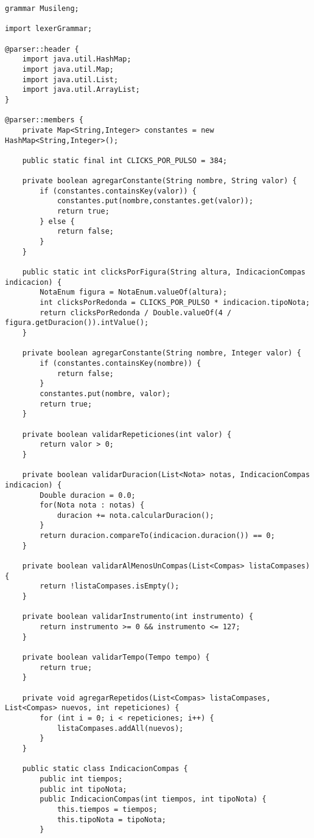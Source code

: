 \begin{verbatim}
grammar Musileng;

import lexerGrammar;

@parser::header {
	import java.util.HashMap;
	import java.util.Map;
	import java.util.List;
	import java.util.ArrayList;
}

@parser::members {
	private Map<String,Integer> constantes = new HashMap<String,Integer>();
	
	public static final int CLICKS_POR_PULSO = 384;
	
	private boolean agregarConstante(String nombre, String valor) {
		if (constantes.containsKey(valor)) {
			constantes.put(nombre,constantes.get(valor));
			return true;
		} else {
			return false;
		}
	}
	
	public static int clicksPorFigura(String altura, IndicacionCompas indicacion) {
		NotaEnum figura = NotaEnum.valueOf(altura);
		int clicksPorRedonda = CLICKS_POR_PULSO * indicacion.tipoNota;
		return clicksPorRedonda / Double.valueOf(4 / figura.getDuracion()).intValue();
	}
	
	private boolean agregarConstante(String nombre, Integer valor) {
		if (constantes.containsKey(nombre)) {
			return false;
		}
		constantes.put(nombre, valor);
		return true;
	}
	
	private boolean validarRepeticiones(int valor) {
		return valor > 0;
	}
	
	private boolean validarDuracion(List<Nota> notas, IndicacionCompas indicacion) {
		Double duracion = 0.0;
		for(Nota nota : notas) {
			duracion += nota.calcularDuracion();
		}
		return duracion.compareTo(indicacion.duracion()) == 0;
	}
	
	private boolean validarAlMenosUnCompas(List<Compas> listaCompases) {
		return !listaCompases.isEmpty();
	}
	
	private boolean validarInstrumento(int instrumento) {
		return instrumento >= 0 && instrumento <= 127;
	}
		
	private boolean validarTempo(Tempo tempo) {
		return true;
	}
	
	private void agregarRepetidos(List<Compas> listaCompases, List<Compas> nuevos, int repeticiones) {
		for (int i = 0; i < repeticiones; i++) {
			listaCompases.addAll(nuevos);
		}
	}
	
	public static class IndicacionCompas {
		public int tiempos;
		public int tipoNota;
		public IndicacionCompas(int tiempos, int tipoNota) {
			this.tiempos = tiempos;
			this.tipoNota = tipoNota;
		}
		

\end{verbatim}
